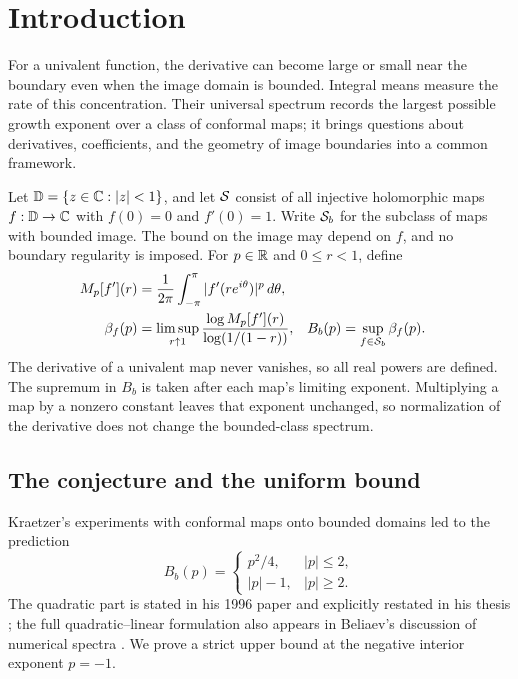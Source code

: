 \section{Introduction}\label{sec:introduction}

For a univalent function, the derivative can become large or small near
the boundary even when the image domain is bounded. Integral means
measure the rate of this concentration. Their universal spectrum records
the largest possible growth exponent over a class of conformal maps;
it brings questions about derivatives, coefficients, and the geometry
of image boundaries into a common framework.

Let \(\mathbb D=\{z\in\mathbb C:|z|<1\}\), and let \(\mathcal S\) consist of all
injective holomorphic maps \(f:\mathbb D\to\mathbb C\) with \(f(0)=0\) and
\(f'(0)=1\). Write \(\mathcal S_b\) for the subclass of maps with bounded
image. The bound on the image may depend on \(f\), and no boundary
regularity is imposed. For \(p\in\mathbb R\) and \(0\le r<1\), define
\begin{align*}
 M_p[f'](r)&=\frac1{2\pi}\int_{-\pi}^{\pi}|f'(re^{i\theta})|^p\,d\theta,\\
 \beta_f(p)&=\limsup_{r\uparrow1}
 \frac{\log M_p[f'](r)}{\log(1/(1-r))},
 &B_b(p)&=\sup_{f\in\mathcal S_b}\beta_f(p).
\end{align*}
The derivative of a univalent map never vanishes, so all real powers
are defined. The supremum in \(B_b\) is taken after each map's limiting
exponent. Multiplying a map by a nonzero constant leaves that exponent
unchanged, so normalization of the derivative does not change the
bounded-class spectrum.

\subsection{The conjecture and the uniform bound}

Kraetzer's experiments with conformal maps onto bounded domains led
to the prediction
\begin{equation}\label{eq:kraetzer}
 B_b(p)=
 \begin{cases}
 p^2/4,&|p|\le2,\\
 |p|-1,&|p|\ge2.
 \end{cases}
\end{equation}
The quadratic part is stated in his 1996 paper and explicitly
restated in his thesis \cite{Kraetzer,KraetzerThesis}; the full
quadratic--linear formulation also appears in Beliaev's discussion
of numerical spectra \cite{Beliaev}. We prove a strict upper bound
at the negative interior exponent \(p=-1\).

